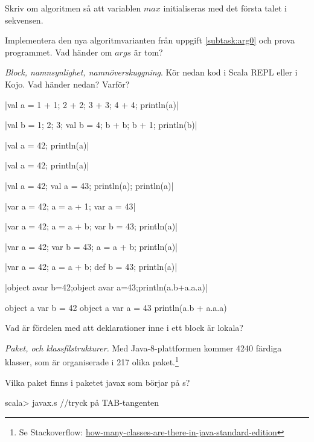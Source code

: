 \Subtask\Pen \label{subtask:arg0} Skriv om algoritmen så att variablen $max$ initialiseras med det första talet i sekvensen. 

\Subtask Implementera den nya algoritmvarianten från uppgift \ref{subtask:arg0} och prova programmet. Vad händer om $args$ är tom?

\Task \emph{Block, namnsynlighet, namnöverskuggning}. Kör nedan kod i Scala REPL eller i Kojo. Vad händer nedan? Varför?

\Subtask \code|val a = {1 + 1; 2 + 2; 3 + 3; 4 + 4}; println(a)|

\Subtask \code|val b = {1; 2; 3; {val b = 4; b + b; b + 1}}; println(b)|

\Subtask \code|{val a = 42; println(a)}|

\Subtask \code|{val a = 42}; println(a)|

\Subtask \code|{val a = 42; {val a = 43; println(a)}; println(a)}|

\Subtask \code|{var a = 42; {a = a + 1}; var a = 43}|

\Subtask \code|{var a = 42; {a = a + b; var b = 43}; println(a)}|

\Subtask \code|{var a = 42; {var b = 43; a = a + b}; println(a)}|

\Subtask \code|{var a = 42; {a = a + b; def b = 43}; println(a)}|

\Subtask \code|{object a{var b=42;object a{var a=43}};println(a.b+a.a.a)}|

\Subtask 

\begin{Code}
{
  object a {
    var b = 42
    object a {
      var a = 43
    }
  }
  println(a.b + a.a.a)
}
\end{Code}

\Subtask Vad är fördelen med att deklarationer inne i ett block är lokala?


\Task \label{task:package} \emph{Paket,  och klassfilstrukturer.} Med Java-8-plattformen kommer 4240 färdiga klasser, som är organiserade i 217 olika paket.\footnote{Se Stackoverflow: \href{http://stackoverflow.com/questions/3112882/how-many-classes-are-there-in-java-standard-edition}{how-many-classes-are-there-in-java-standard-edition}}

\Subtask Vilka paket finns i paketet javax som börjar på s?

\begin{REPL}
scala> javax.s   //tryck på TAB-tangenten
\end{REPL} 

